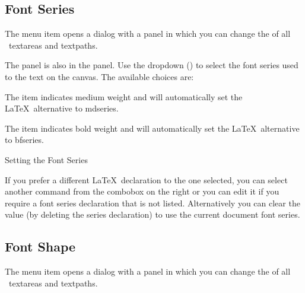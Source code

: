 
\subsection{Font Series}\label{sec:fontseries}


The  menu item opens a dialog with a 
 panel in which you can change the
of all \selected\ \glspl{textarea} and \glspl{textpath}.


The  panel is also in the 
panel. Use the \gls{dropdown} () to
select the font series used to  the
text on the \gls{canvas}.
The available choices are:


The  item indicates medium weight and
will automatically set the \LaTeX\ alternative to \gls{mdseries}.


The  item indicates bold weight and
will automatically set the \LaTeX\ alternative to \gls{bfseries}.

{}
{Setting the Font Series}

If you prefer a different \LaTeX\ declaration to the one selected,
you can select another command from the \gls{combobox} on the right
or you can edit it if you require a font series declaration that is
not listed.  Alternatively you can clear the value (by deleting the
series declaration) to use the current document font series.

\subsection{Font Shape}\label{sec:fontshape}


The  menu item opens a dialog with a 
 panel in which you can change the
of all \selected\ \glspl{textarea} and \glspl{textpath}.

